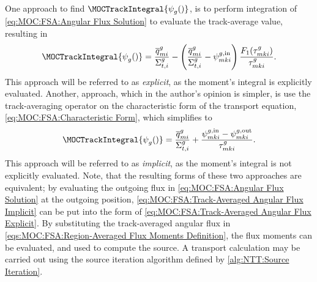 {{{            One approach to find $\MOCTrackIntegral{\aflux[][g][]}$, is to perform integration of \cref{eq:MOC:FSA:Angular Flux Solution} to evaluate the track-average value, resulting in
            \begin{equation}\label{eq:MOC:FSA:Track-Averaged Angular Flux Explicit}
                \MOCTrackIntegral{\aflux[][g][]} = \frac{\tsrcF[mi]}{\xst} - \left(\frac{\tsrcF[mi]}{\xst} - \afluxin\right)\frac{F_1(\segopt)}{\segopt}.
            \end{equation}
            This approach will be referred to as \emph{explicit}, as the moment's integral is explicitly evaluated.
            Another, approach, which in the author's opinion is simpler, is use the track-averaging operator on the characteristic form of the transport equation, \cref{eq:MOC:FSA:Characteristic Form}, which simplifies to
            \begin{equation}\label{eq:MOC:FSA:Track-Averaged Angular Flux Implicit}
                \MOCTrackIntegral{\aflux[][g][]} = \frac{\tsrcF[mi]}{\xst} + \frac{\afluxin-\afluxout}{\segopt}.
            \end{equation}
            This approach will be referred to as \emph{implicit}, as the moment's integral is not explicitly evaluated.
            Note, that the resulting forms of these two approaches are equivalent; by evaluating the outgoing flux in \cref{eq:MOC:FSA:Angular Flux Solution} at the outgoing position, \cref{eq:MOC:FSA:Track-Averaged Angular Flux Implicit} can be put into the form of \cref{eq:MOC:FSA:Track-Averaged Angular Flux Explicit}.
            By substituting the track-averaged angular flux in \cref{eqs:MOC:FSA:Region-Averaged Flux Moments Definition}, the flux moments can be evaluated, and used to compute the source.
            A transport calculation may be carried out using the source iteration algorithm defined by \cref{alg:NTT:Source Iteration}.
        }
}}
